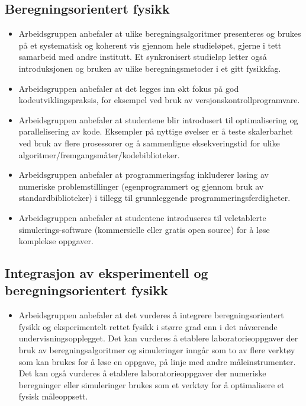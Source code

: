 \documentclass{article}
\begin{document}
\subsection{Beregningsorientert fysikk}
\begin{itemize}
  \item Arbeidsgruppen anbefaler at ulike beregningsalgoritmer presenteres og brukes på et systematisk og koherent vis gjennom hele studieløpet, gjerne i tett samarbeid med andre institutt. Et synkronisert studieløp letter også introduksjonen og bruken av ulike beregningsmetoder i et gitt fysikkfag.
  \item Arbeidsgruppen anbefaler at det legges inn økt fokus på god kodeutviklingspraksis, for eksempel ved bruk av versjonskontrollprogramvare.
  \item Arbeidsgruppen anbefaler at studentene blir introdusert til optimalisering og parallelisering av kode. Eksempler på nyttige øvelser er å teste skalerbarhet ved bruk av flere prosessorer og å sammenligne eksekveringstid for ulike algoritmer/fremgangsmåter/kodebiblioteker.
  \item Arbeidsgruppen anbefaler at programmeringsfag inkluderer løsing av numeriske problemstillinger (egenprogrammert og gjennom bruk av standardbiblioteker) i tillegg til grunnleggende programmeringsferdigheter.
  \item Arbeidsgruppen anbefaler at studentene introduseres til veletablerte simulerings-software (kommersielle eller gratis open source) for å løse komplekse oppgaver.
\end{itemize}

\subsection{Integrasjon av eksperimentell og beregningsorientert fysikk}
\begin{itemize}
  \item Arbeidsgruppen anbefaler at det vurderes å integrere beregningsorientert fysikk og eksperimentelt rettet fysikk i større grad enn i det nåværende undervisningsopplegget. Det kan vurderes å etablere laboratorieoppgaver der bruk av beregningsalgoritmer og simuleringer inngår som to av flere verktøy som kan brukes for å løse en oppgave, på linje med andre måleinstrumenter. Det kan også vurderes å etablere laboratorieoppgaver der numeriske beregninger eller simuleringer brukes som et verktøy for å optimalisere et fysisk måleoppsett.
\end{itemize}
\end{document}
